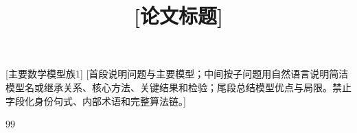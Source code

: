 \documentclass[withoutpreface]{51mcmthesis}
\title{[论文标题]}
\begin{document}
\maketitle

\begin{kwabstract}{[主要数学模型族1]\quad [主要数学模型族2]\quad [核心算法1]\quad [核心算法2]}
[首段说明问题与主要模型；中间按子问题用自然语言说明简洁模型名或继承关系、核心方法、关键结果和检验；尾段总结模型优点与局限。禁止字段化身份句式、内部术语和完整算法链。]
\end{kwabstract}













\begin{thebibliography}{99}
\end{thebibliography}

\begin{appendices}


\end{appendices}
\end{document}

